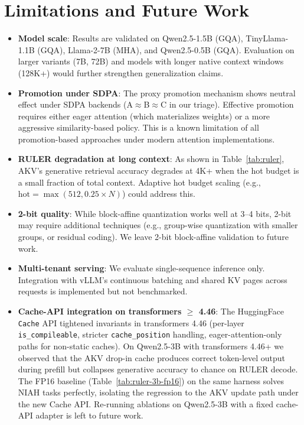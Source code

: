\documentclass[11pt,a4paper]{article}
\begin{document}
\section{Limitations and Future Work}
\label{sec:limitations}

\begin{itemize}
    \item \textbf{Model scale}: Results are validated on Qwen2.5-1.5B (GQA), TinyLlama-1.1B (GQA), Llama-2-7B (MHA), and Qwen2.5-0.5B (GQA). Evaluation on larger variants (7B, 72B) and models with longer native context windows (128K+) would further strengthen generalization claims.
    \item \textbf{Promotion under SDPA}: The proxy promotion mechanism shows neutral effect under SDPA backends (A$\approx$B$\approx$C in our triage). Effective promotion requires either eager attention (which materializes weights) or a more aggressive similarity-based policy. This is a known limitation of all promotion-based approaches under modern attention implementations.
    \item \textbf{RULER degradation at long context}: As shown in Table~\ref{tab:ruler}, AKV's generative retrieval accuracy degrades at 4K+ when the hot budget is a small fraction of total context. Adaptive hot budget scaling (e.g., $\text{hot} = \max(512, 0.25 \times N)$) could address this.
    \item \textbf{2-bit quality}: While block-affine quantization works well at 3--4 bits, 2-bit may require additional techniques (e.g., group-wise quantization with smaller groups, or residual coding). We leave 2-bit block-affine validation to future work.
    \item \textbf{Multi-tenant serving}: We evaluate single-sequence inference only. Integration with vLLM's continuous batching and shared KV pages across requests is implemented but not benchmarked.
    \item \textbf{Cache-API integration on transformers $\geq$ 4.46}: The HuggingFace \texttt{Cache} API tightened invariants in transformers 4.46 (per-layer \texttt{is\_compileable}, stricter \texttt{cache\_position} handling, eager-attention-only paths for non-static caches). On Qwen2.5-3B with transformers 4.46+ we observed that the AKV drop-in cache produces correct token-level output during prefill but collapses generative accuracy to chance on RULER decode. The FP16 baseline (Table~\ref{tab:ruler-3b-fp16}) on the same harness solves NIAH tasks perfectly, isolating the regression to the AKV update path under the new Cache API. Re-running ablations on Qwen2.5-3B with a fixed cache-API adapter is left to future work.
\end{itemize}
\end{document}
